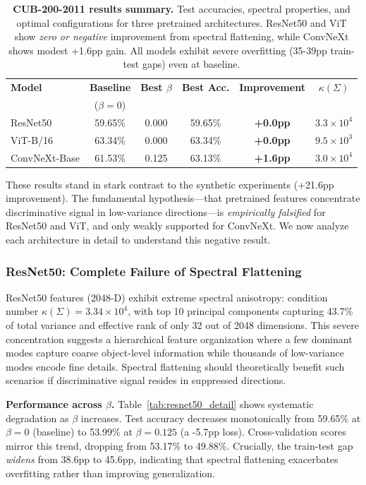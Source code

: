 \documentclass[11pt]{article}
\begin{document}
\begin{table}[h]
\centering
\caption{\textbf{CUB-200-2011 results summary.} Test accuracies, spectral properties, and optimal configurations for three pretrained architectures. ResNet50 and ViT show \emph{zero or negative} improvement from spectral flattening, while ConvNeXt shows modest +1.6pp gain. All models exhibit severe overfitting (35-39pp train-test gaps) even at baseline.}
\label{tab:cub_results}
\begin{tabular}{lccccc}
\toprule
\textbf{Model} & \textbf{Baseline} & \textbf{Best $\beta$} & \textbf{Best Acc.} & \textbf{Improvement} & \textbf{$\kappa(\Sigma)$} \\
 & ($\beta=0$) & & & & \\
\midrule
ResNet50 & 59.65\% & 0.000 & 59.65\% & \textbf{+0.0pp} & $3.3 \times 10^4$ \\
ViT-B/16 & 63.34\% & 0.000 & 63.34\% & \textbf{+0.0pp} & $9.5 \times 10^3$ \\
ConvNeXt-Base & 61.53\% & 0.125 & 63.13\% & \textbf{+1.6pp} & $3.0 \times 10^4$ \\
\bottomrule
\end{tabular}
\end{table}

These results stand in stark contrast to the synthetic experiments (+21.6pp improvement). The fundamental hypothesis---that pretrained features concentrate discriminative signal in low-variance directions---is \emph{empirically falsified} for ResNet50 and ViT, and only weakly supported for ConvNeXt. We now analyze each architecture in detail to understand this negative result.

\subsubsection{ResNet50: Complete Failure of Spectral Flattening}

ResNet50 features (2048-D) exhibit extreme spectral anisotropy: condition number $\kappa(\Sigma) = 3.34 \times 10^4$, with top 10 principal components capturing 43.7\% of total variance and effective rank of only 32 out of 2048 dimensions. This severe concentration suggests a hierarchical feature organization where a few dominant modes capture coarse object-level information while thousands of low-variance modes encode fine details. Spectral flattening should theoretically benefit such scenarios if discriminative signal resides in suppressed directions.

\textbf{Performance across $\beta$.} Table~\ref{tab:resnet50_detail} shows systematic degradation as $\beta$ increases. Test accuracy decreases monotonically from 59.65\% at $\beta=0$ (baseline) to 53.99\% at $\beta=0.125$ (a -5.7pp loss). Cross-validation scores mirror this trend, dropping from 53.17\% to 49.88\%. Crucially, the train-test gap \emph{widens} from 38.6pp to 45.6pp, indicating that spectral flattening exacerbates overfitting rather than improving generalization.
\end{document}
